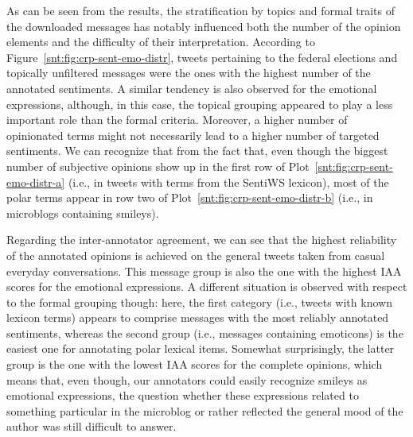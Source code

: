 As can be seen from the results, the stratification by topics and
formal traits of the downloaded messages has notably influenced both
the number of the opinion elements and the difficulty of their
interpretation.  According to Figure~\ref{snt:fig:crp-sent-emo-distr},
tweets pertaining to the federal elections and topically unfiltered
messages were the ones with the highest number of the annotated
sentiments.  A similar tendency is also observed for the emotional
expressions, although, in this case, the topical grouping appeared to
play a less important role than the formal criteria.  Moreover, a
higher number of opinionated terms might not necessarily lead to a
higher number of targeted sentiments.  We can recognize that from the
fact that, even though the biggest number of subjective opinions show
up in the first row of Plot~\ref{snt:fig:crp-sent-emo-distr-a} (i.e.,
in tweets with terms from the SentiWS lexicon), most of the polar
terms appear in row two of Plot~\ref{snt:fig:crp-sent-emo-distr-b}
(i.e., in microblogs containing smileys).

Regarding the inter-annotator agreement, we can see that the highest
reliability of the annotated opinions is achieved on the general
tweets taken from casual everyday conversations.  This message group
is also the one with the highest IAA scores for the emotional
expressions.  A different situation is observed with respect to the
formal grouping though: here, the first category (i.e., tweets with
known lexicon terms) appears to comprise messages with the most
reliably annotated sentiments, whereas the second group (i.e.,
messages containing emoticons) is the easiest one for annotating polar
lexical items.  Somewhat surprisingly, the latter group is the one
with the lowest IAA scores for the complete opinions, which means
that, even though, our annotators could easily recognize smileys as
emotional expressions, the question whether these expressions related
to something particular in the microblog or rather reflected the
general mood of the author was still difficult to answer.

